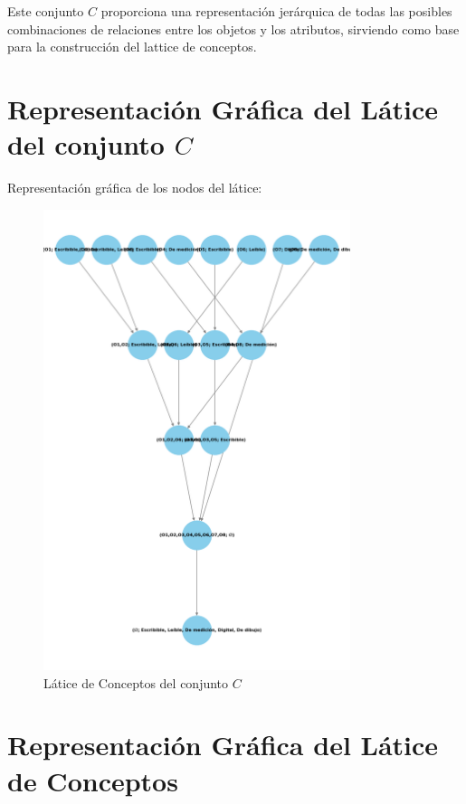   Este conjunto \( C \) proporciona una representación jerárquica de todas las posibles combinaciones de relaciones entre los objetos y los atributos, sirviendo como base para la construcción del lattice de conceptos.

\section{Representación Gráfica del Látice del conjunto  \( C \)}
Representación gráfica de los nodos del látice:

\begin{figure}[H]
  \centering
  \includegraphics[width=0.8\textwidth]{Figures/1. Content/c_set_lattice_vertical.png}
  \caption{Látice de Conceptos del conjunto  \( C \)}
  \label{fig:c_set_lattice_vertical}
\end{figure}
  
\section{Representación Gráfica del Látice de Conceptos}

